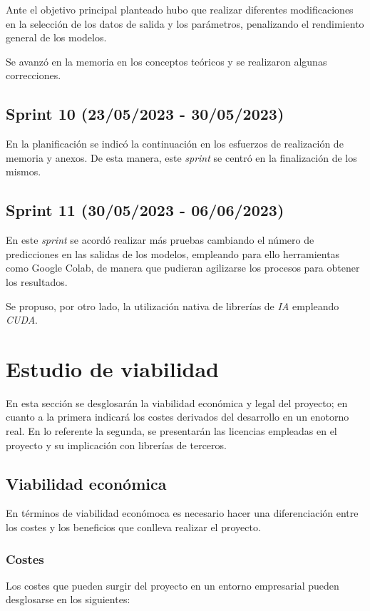 Ante el objetivo principal planteado hubo que realizar diferentes modificaciones en la selección de los datos de salida y los parámetros, penalizando el rendimiento
general de los modelos.

Se avanzó en la memoria en los conceptos teóricos y se realizaron algunas correcciones.

\subsection{Sprint 10 (23/05/2023 - 30/05/2023)}
En la planificación se indicó la continuación en los esfuerzos de realización de memoria y anexos.
De esta manera, este \textit{sprint} se centró en la finalización de los mismos.

\subsection{Sprint 11 (30/05/2023 - 06/06/2023)}
En este \textit{sprint} se acordó realizar más pruebas cambiando el número de predicciones en las salidas de los modelos,
empleando para ello herramientas como Google Colab, de manera que pudieran agilizarse los procesos para obtener los resultados.

Se propuso, por otro lado, la utilización nativa de librerías de \textit{IA} empleando \textit{CUDA}.

\section{Estudio de viabilidad}
En esta sección se desglosarán la viabilidad económica y legal del proyecto; en cuanto a la primera indicará los costes derivados del desarrollo en un enotorno real.
En lo referente la segunda, se presentarán las licencias empleadas en el proyecto y su implicación con librerías de terceros.

\subsection{Viabilidad económica}
En términos de viabilidad económoca es necesario hacer una diferenciación entre los costes y los beneficios que conlleva realizar el proyecto.

\subsubsection{Costes}
Los costes que pueden surgir del proyecto en un entorno empresarial pueden desglosarse en los siguientes:

